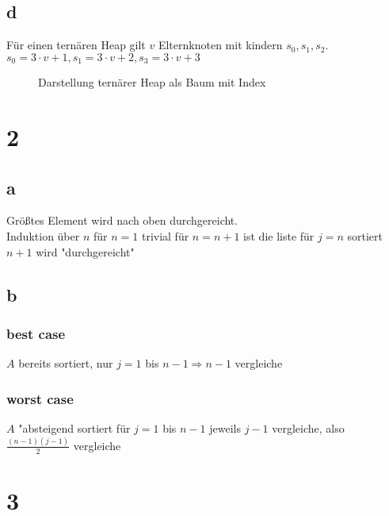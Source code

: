 \documentclass{article}
\begin{document}
\subsection*{d}
Für einen ternären Heap gilt $v$ Elternknoten mit kindern $s_0,s_1,s_2$.\\
$s_0 = 3\cdot v + 1, s_1 = 3\cdot v+2, s_3=3\cdot v+3$
\begin{figure}[h!]
    \caption{Darstellung ternärer Heap als Baum mit Index}
\end{figure}
\section*{2}
\subsection*{a} 
Größtes Element wird nach oben durchgereicht.\\
Induktion über $n$ für $n=1$ trivial
für $n=n+1$ ist die liste für $j=n$ sortiert
$n+1$ wird "durchgereicht"
\subsection*{b}
\subsubsection*{best case}
$A$ bereits sortiert, nur $j=1$ bis $n-1\Rightarrow n-1$ vergleiche
\subsubsection*{worst case}
$A$ "absteigend sortiert für $j=1$ bis $n-1$ jeweils
$j-1$ vergleiche, also $\frac{(n-1)(j-1)}{2}$ vergleiche

\section*{3}
\end{document}
